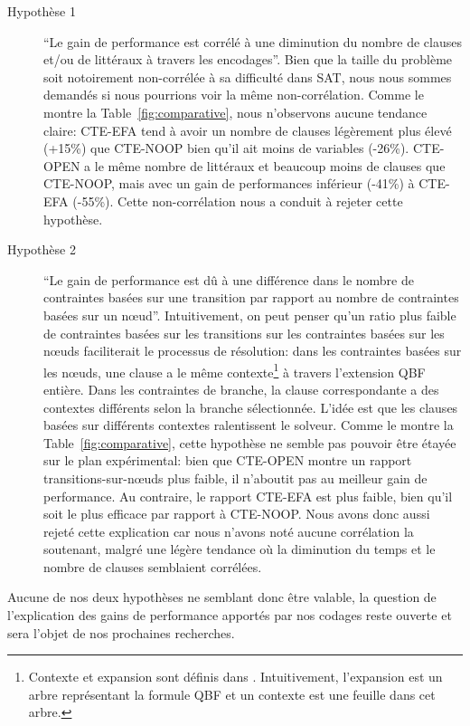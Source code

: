 \begin{description}
\item[Hypothèse 1] \enquote{Le gain de performance est corrélé à une diminution du nombre de clauses et/ou de littéraux à travers les encodages}. Bien que la taille du problème soit notoirement non-corrélée à sa difficulté dans SAT, nous nous sommes demandés si nous pourrions voir la même non-corrélation. Comme le montre la Table~\ref{fig:comparative}, nous n'observons aucune tendance claire: CTE-EFA tend à avoir un nombre de clauses légèrement plus élevé (+15\%) que CTE-NOOP bien qu'il ait moins de variables (-26\%). CTE-OPEN a le même nombre de littéraux et beaucoup moins de clauses que CTE-NOOP, mais avec un gain de performances inférieur (-41\%) à CTE-EFA (-55\%). Cette non-corrélation nous a conduit à rejeter cette hypothèse.
~\\

\item[Hypothèse 2] \enquote{Le gain de performance est dû à une différence dans le nombre de contraintes basées sur une transition par rapport au nombre de contraintes basées sur un n\oe ud}. Intuitivement, on peut penser qu'un ratio plus faible de contraintes basées sur les transitions sur les contraintes basées sur les n\oe uds faciliterait le processus de résolution: dans les contraintes basées sur les n\oe uds, une clause a le même contexte\footnote {Contexte et expansion sont définis dans \cite{DBLP:conf/ecai/CashmoreFG12}. Intuitivement, l'expansion est un arbre représentant la formule QBF et un contexte est une feuille dans cet arbre.} à travers l'extension QBF entière. Dans les contraintes de branche, la clause correspondante a des contextes différents selon la branche sélectionnée. L'idée est que les clauses basées sur différents contextes ralentissent le solveur. Comme le montre la Table~\ref{fig:comparative}, cette hypothèse ne semble pas pouvoir être étayée sur le plan expérimental: bien que CTE-OPEN montre un rapport transitions-sur-n\oe uds plus faible, il n'aboutit pas au meilleur gain de performance. Au contraire, le rapport CTE-EFA est plus faible, bien qu'il soit le plus efficace par rapport à CTE-NOOP. Nous avons donc aussi rejeté cette explication car nous n'avons noté aucune corrélation la soutenant, malgré une légère tendance où la diminution du temps et le nombre de clauses semblaient corrélées.
\end{description}

Aucune de nos deux hypothèses ne semblant donc être valable, la question de l'explication des gains de performance apportés par nos codages reste ouverte et sera l'objet de nos prochaines recherches.


